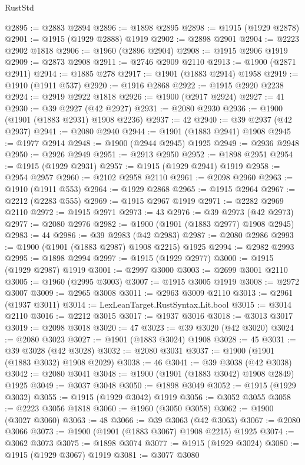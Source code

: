 \begin{lexlean}{RustStd}
\begin{coremodule}
{\begin{coremodule}
{{{{{{{{{{{{{{{{{{{{{{{{{{{{{{{{{{{{{{{{{{{@2895 := @2883 @2894
@2896 := @1898 @2895
@2898 := @1915 (@1929 @2878)
@2901 := @1915 (@1929 @2888) @1919
@2902 := @2898 @2901
@2904 := @2223 @2902 @1818
@2906 := @1960 (@2896 @2904)
@2908 := @1915 @2906 @1919
@2909 := @2873 @2908
@2911 := @2746 @2909 @2110
@2913 := @1900 (@2871 @2911)
@2914 := @1885 @278
@2917 := @1901 (@1883 @2914) @1958
@2919 := @1910 (@1911 @537)
@2920 := @1916 @2868
@2922 := @1915 @2920 @2238
@2924 := @2919 @2922 @1818
@2926 := @1900 (@2917 @2924)
@2927 := 41
@2930 := @39 @2927 (@42 @2927)
@2931 := @2080 @2930
@2936 := @1900 (@1901 (@1883 @2931) @1908 @2236)
@2937 := 42
@2940 := @39 @2937 (@42 @2937)
@2941 := @2080 @2940
@2944 := @1901 (@1883 @2941) @1908
@2945 := @1977 @2914
@2948 := @1900 (@2944 @2945) @1925
@2949 := @2936 @2948
@2950 := @2926 @2949
@2951 := @2913 @2950
@2952 := @1898 @2951
@2954 := @1915 (@1929 @2931)
@2957 := @1915 (@1929 @2941) @1919
@2958 := @2954 @2957
@2960 := @2102 @2958 @2110
@2961 := @2098 @2960
@2963 := @1910 (@1911 @553)
@2964 := @1929 @2868
@2965 := @1915 @2964
@2967 := @2212 (@2283 @555)
@2969 := @1915 @2967 @1919
@2971 := @2282 @2969 @2110
@2972 := @1915 @2971
@2973 := 43
@2976 := @39 @2973 (@42 @2973)
@2977 := @2080 @2976
@2982 := @1900 (@1901 (@1883 @2977) @1908 @2945)
@2983 := 44
@2986 := @39 @2983 (@42 @2983)
@2987 := @2080 @2986
@2993 := @1900 (@1901 (@1883 @2987) @1908 @2215) @1925
@2994 := @2982 @2993
@2995 := @1898 @2994
@2997 := @1915 (@1929 @2977)
@3000 := @1915 (@1929 @2987) @1919
@3001 := @2997 @3000
@3003 := @2699 @3001 @2110
@3005 := @1960 (@2995 @3003)
@3007 := @1915 @3005 @1919
@3008 := @2972 @3007
@3009 := @2965 @3008
@3011 := @2963 @3009 @2110
@3013 := @2961 (@1937 @3011)
@3014 := LexLeanTarget.RustSyntax.Lit.bool
@3015 := @3014 @2110
@3016 := @2212 @3015
@3017 := @1937 @3016
@3018 := @3013 @3017
@3019 := @2098 @3018
@3020 := 47
@3023 := @39 @3020 (@42 @3020)
@3024 := @2080 @3023
@3027 := @1901 (@1883 @3024) @1908
@3028 := 45
@3031 := @39 @3028 (@42 @3028)
@3032 := @2080 @3031
@3037 := @1900 (@1901 (@1883 @3032) @1908 @2029)
@3038 := 46
@3041 := @39 @3038 (@42 @3038)
@3042 := @2080 @3041
@3048 := @1900 (@1901 (@1883 @3042) @1908 @2849) @1925
@3049 := @3037 @3048
@3050 := @1898 @3049
@3052 := @1915 (@1929 @3032)
@3055 := @1915 (@1929 @3042) @1919
@3056 := @3052 @3055
@3058 := @2223 @3056 @1818
@3060 := @1960 (@3050 @3058)
@3062 := @1900 (@3027 @3060)
@3063 := 48
@3066 := @39 @3063 (@42 @3063)
@3067 := @2080 @3066
@3073 := @1900 (@1901 (@1883 @3067) @1908 @2215) @1925
@3074 := @3062 @3073
@3075 := @1898 @3074
@3077 := @1915 (@1929 @3024)
@3080 := @1915 (@1929 @3067) @1919
@3081 := @3077 @3080
}}}}}}}}}}}}}}}}}}}}}}}}}}}}}}}}}}}}}}}}}}}
\end{coremodule}}
\end{coremodule}
\end{lexlean}
